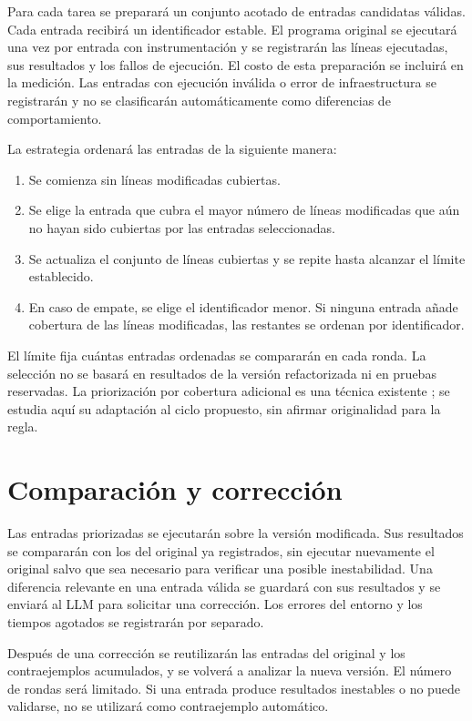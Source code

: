 \documentclass[11pt,openright,final]{unsa}
\begin{document}
Para cada tarea se preparará un conjunto acotado de entradas candidatas válidas. Cada entrada recibirá un identificador estable. El programa original se ejecutará una vez por entrada con instrumentación y se registrarán las líneas ejecutadas, sus resultados y los fallos de ejecución. El costo de esta preparación se incluirá en la medición. Las entradas con ejecución inválida o error de infraestructura se registrarán y no se clasificarán automáticamente como diferencias de comportamiento.

La estrategia ordenará las entradas de la siguiente manera:

\begin{enumerate}
\item Se comienza sin líneas modificadas cubiertas.
\item Se elige la entrada que cubra el mayor número de líneas modificadas que aún no hayan sido cubiertas por las entradas seleccionadas.
\item Se actualiza el conjunto de líneas cubiertas y se repite hasta alcanzar el límite establecido.
\item En caso de empate, se elige el identificador menor. Si ninguna entrada añade cobertura de las líneas modificadas, las restantes se ordenan por identificador.
\end{enumerate}

El límite fija cuántas entradas ordenadas se compararán en cada ronda. La selección no se basará en resultados de la versión refactorizada ni en pruebas reservadas. La priorización por cobertura adicional es una técnica existente \cite{ref9}; se estudia aquí su adaptación al ciclo propuesto, sin afirmar originalidad para la regla.

\section{Comparación y corrección}

Las entradas priorizadas se ejecutarán sobre la versión modificada. Sus resultados se compararán con los del original ya registrados, sin ejecutar nuevamente el original salvo que sea necesario para verificar una posible inestabilidad. Una diferencia relevante en una entrada válida se guardará con sus resultados y se enviará al LLM para solicitar una corrección. Los errores del entorno y los tiempos agotados se registrarán por separado.

Después de una corrección se reutilizarán las entradas del original y los contraejemplos acumulados, y se volverá a analizar la nueva versión. El número de rondas será limitado. Si una entrada produce resultados inestables o no puede validarse, no se utilizará como contraejemplo automático.
\end{document}
